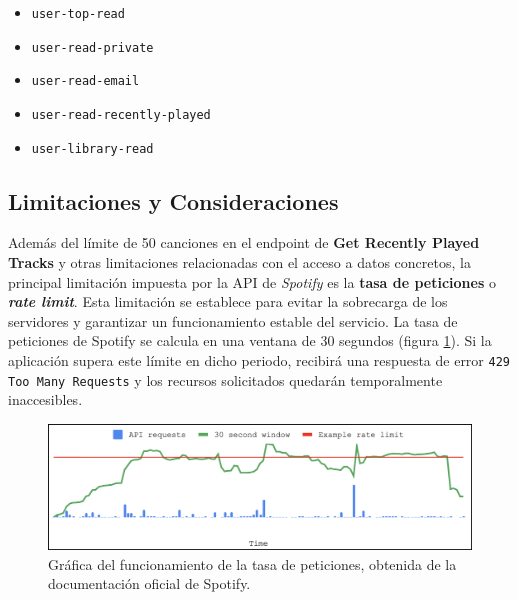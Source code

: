 \setlength{\columnsep}{-1em} %
\begin{multicols}{2} %
    \begin{itemize}
        \setlength{\itemsep}{0.3em} %
        \setlength{\topsep}{0.5em}  %
        \setlength{\parsep}{0pt}    %
        \setlength{\parskip}{0pt}   %
        \item \texttt{user-top-read}
        \item \texttt{user-read-private}
        \item \texttt{user-read-email}
        \item \texttt{user-read-recently-played}
        \item \texttt{user-library-read}
    \end{itemize}
\end{multicols}

\subsection{Limitaciones y Consideraciones}

Además del límite de 50 canciones en el endpoint de \textbf{Get Recently Played Tracks} y otras limitaciones relacionadas con el acceso a datos concretos, la principal limitación impuesta por la API de \textit{Spotify} es la \textbf{tasa de peticiones} o  \textit{\textbf{rate limit}}. Esta limitación se establece para evitar la sobrecarga de los servidores y garantizar un funcionamiento estable del servicio. La tasa de peticiones de Spotify se calcula en una ventana de 30 segundos (figura \ref{fig:rate_limit}). Si la aplicación supera este límite en dicho periodo, recibirá una respuesta de error \texttt{429 Too Many Requests} y los recursos solicitados quedarán temporalmente inaccesibles.

\begin{figure}[H]
    \centering
    \includegraphics[width=\textwidth]{figures/rate_limit.png}
    \caption{Gráfica del funcionamiento de la tasa de peticiones, obtenida de la documentación oficial de Spotify.}
    \label{fig:rate_limit}
\end{figure}

